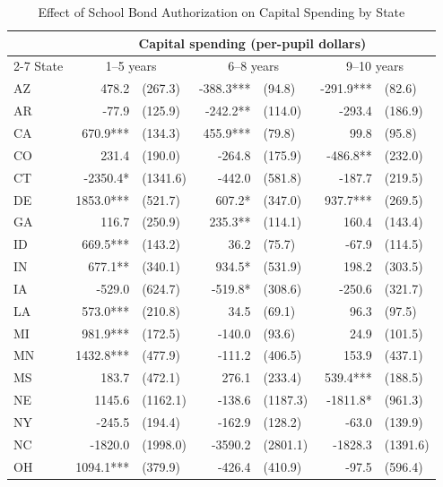 \begin{table}[htbp]
    \centering
    \caption{Effect of School Bond Authorization on Capital Spending by State}
    \label{tab:state_capital}
    \begin{threeparttable}
    \begin{tabular}{l*{3}{r@{\hspace{3pt}}l}}
    \toprule
    & \multicolumn{6}{c}{Capital spending (per-pupil dollars)} \\
    \cmidrule(lr){2-7}
    State & \multicolumn{2}{c}{1--5 years} & \multicolumn{2}{c}{6--8 years} & \multicolumn{2}{c}{9--10 years} \\
    \midrule
    AZ & 478.2 & (267.3) & -388.3*** & (94.8) & -291.9*** & (82.6) \\
    AR & -77.9 & (125.9) & -242.2** & (114.0) & -293.4 & (186.9) \\
    CA & 670.9*** & (134.3) & 455.9*** & (79.8) & 99.8 & (95.8) \\
    CO & 231.4 & (190.0) & -264.8 & (175.9) & -486.8** & (232.0) \\
    CT & -2350.4* & (1341.6) & -442.0 & (581.8) & -187.7 & (219.5) \\
    DE & 1853.0*** & (521.7) & 607.2* & (347.0) & 937.7*** & (269.5) \\
    GA & 116.7 & (250.9) & 235.3** & (114.1) & 160.4 & (143.4) \\
    ID & 669.5*** & (143.2) & 36.2 & (75.7) & -67.9 & (114.5) \\
    IN & 677.1** & (340.1) & 934.5* & (531.9) & 198.2 & (303.5) \\
    IA & -529.0 & (624.7) & -519.8* & (308.6) & -250.6 & (321.7) \\
    LA & 573.0*** & (210.8) & 34.5 & (69.1) & 96.3 & (97.5) \\
    MI & 981.9*** & (172.5) & -140.0 & (93.6) & 24.9 & (101.5) \\
    MN & 1432.8*** & (477.9) & -111.2 & (406.5) & 153.9 & (437.1) \\
    MS & 183.7 & (472.1) & 276.1 & (233.4) & 539.4*** & (188.5) \\
    NE & 1145.6 & (1162.1) & -138.6 & (1187.3) & -1811.8* & (961.3) \\
    NY & -245.5 & (194.4) & -162.9 & (128.2) & -63.0 & (139.9) \\
    NC & -1820.0 & (1998.0) & -3590.2 & (2801.1) & -1828.3 & (1391.6) \\
    OH & 1094.1*** & (379.9) & -426.4 & (410.9) & -97.5 & (596.4) \\

\end{tabular}
\end{threeparttable}
\end{table}
